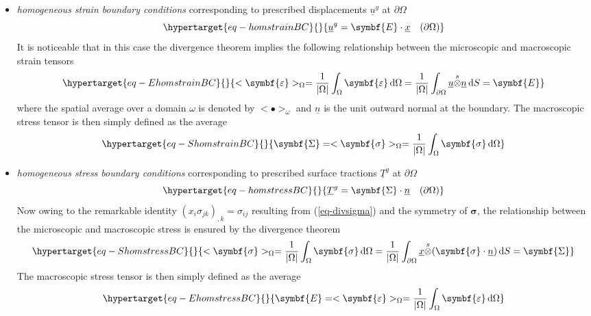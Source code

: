 \documentclass[
  letterpaper,
  DIV=11,
  numbers=noendperiod]{scrreprt}
\newcommand{\uu}[1]{{\symbf{{#1}}}}
\newcommand{\uv}[1]{{\underline{{#1}}}}
\newcommand{\x}{{\uv{{x}}}}
\newcommand{\n}{{\uv{{n}}}}
\newcommand{\eps}{{\uu{{\varepsilon}}}}
\newcommand{\E}{{\uu{{E}}}}
\newcommand{\sig}{{\uu{{\sigma}}}}
\newcommand{\Sig}{{\uu{{\Sigma}}}}
\newcommand{\sotimes}{{\stackrel{s}{\otimes}}}
\newcommand{\ud}{{\,\mathrm{d}}}
\begin{document}
\begin{itemize}
\item
  \emph{homogeneous strain boundary conditions} corresponding to
  prescribed displacements \(\uv{u}^g\) at \(\partial\Omega\)
  \begin{equation}\protect\hypertarget{eq-homstrainBC}{}{
  \uv{u}^g=\E\cdot\x \quad(\partial\Omega)
  }\label{eq-homstrainBC}\end{equation} It is noticeable that in this
  case the divergence theorem implies the following relationship between
  the microscopic and macroscopic strain tensors
  \begin{equation}\protect\hypertarget{eq-EhomstrainBC}{}{
  <\eps>_{\Omega}=\frac{1}{\lvert \Omega \rvert}\int_\Omega \eps\ud \Omega
  =\frac{1}{\lvert \Omega \rvert}\int_{\partial\Omega} \uv{u}\sotimes\n \ud S
  =\E
  }\label{eq-EhomstrainBC}\end{equation} where the spatial average over
  a domain \(\omega\) is denoted by \(<\bullet>_\omega\) and \(\n\) is
  the unit outward normal at the boundary. The macroscopic stress tensor
  is then simply defined as the average
  \begin{equation}\protect\hypertarget{eq-ShomstrainBC}{}{
  \Sig=
  <\sig>_{\Omega}=\frac{1}{\lvert \Omega \rvert}\int_\Omega \sig\ud \Omega
  }\label{eq-ShomstrainBC}\end{equation}
\item
  \emph{homogeneous stress boundary conditions} corresponding to
  prescribed surface tractions \(\uv{T}^g\) at \(\partial\Omega\)
  \begin{equation}\protect\hypertarget{eq-homstressBC}{}{
  \uv{T}^g=\Sig\cdot\n \quad(\partial\Omega)
  }\label{eq-homstressBC}\end{equation} Now owing to the remarkable
  identity \((x_i\sigma_{jk})_{,k}=\sigma_{ij}\) resulting from
  (\ref{eq-divsigma}) and the symmetry of \(\sig\), the relationship
  between the microscopic and macroscopic stress is ensured by the
  divergence theorem
  \begin{equation}\protect\hypertarget{eq-ShomstressBC}{}{
  <\sig>_{\Omega}=\frac{1}{\lvert \Omega \rvert}\int_\Omega \sig\ud \Omega
  =\frac{1}{\lvert \Omega \rvert}\int_{\partial\Omega} \x\sotimes(\sig\cdot\n) \ud S
  =\Sig
  }\label{eq-ShomstressBC}\end{equation} The macroscopic stress tensor
  is then simply defined as the average
  \begin{equation}\protect\hypertarget{eq-EhomstressBC}{}{
  \E=
  <\eps>_{\Omega}=\frac{1}{\lvert \Omega \rvert}\int_\Omega \eps\ud \Omega
  }\label{eq-EhomstressBC}\end{equation}
\end{itemize}
\end{document}
